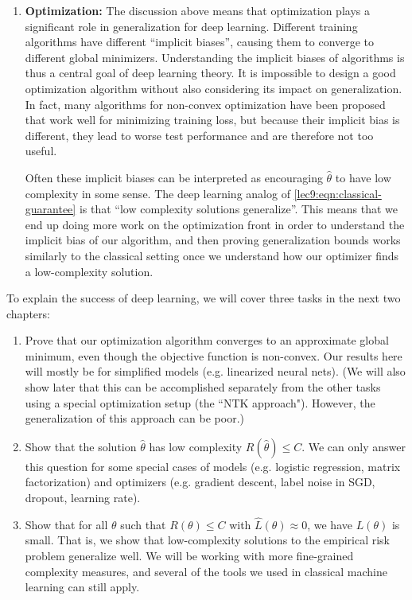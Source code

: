 \begin{enumerate}
\item {\bf Optimization:} The discussion above means that optimization plays a significant role in generalization for deep learning. Different training algorithms have different ``implicit biases'', causing them to converge to different global minimizers. Understanding the implicit biases of algorithms is thus a central goal of deep learning theory. It is impossible to design a good optimization algorithm without also considering its impact on generalization. In fact, many algorithms for non-convex optimization have been proposed that work well for minimizing training loss, but because their implicit bias is different, they lead to worse test performance and are therefore not too useful.
    
Often these implicit biases can be interpreted as encouraging $\hat\theta$ to have low complexity in some sense. The deep learning analog of  \eqref{lec9:eqn:classical-guarantee} is that ``low complexity solutions generalize''. This means that we end up doing more work on the optimization front in order to understand the implicit bias of our algorithm, and then proving generalization bounds works similarly to the classical setting once we understand how our optimizer finds a low-complexity solution.
    
\end{enumerate}

To explain the success of deep learning, we will cover three tasks in the next two chapters:

\begin{enumerate}
    \item Prove that our optimization algorithm converges to an approximate global minimum, even though the objective function is non-convex. Our results here will mostly be for simplified models (e.g. linearized neural nets). (We will also show later that this can be accomplished separately from the other tasks using a special optimization setup (the ``NTK approach"). However, the generalization of this approach can be poor.)
    
    \item Show that the solution $\hat{\theta}$ has low complexity $R(\hat{\theta})\leq C$. We can only answer this question for some special cases of models (e.g. logistic regression, matrix factorization) and optimizers (e.g. gradient descent, label noise in SGD, dropout, learning rate).
    
    \item Show that for all $\theta$ such that $R(\theta)\leq C$ with $\hat{L}(\theta)\approx 0$, we have $L(\theta)$ is small. That is, we show that low-complexity solutions to the empirical risk problem generalize well. We will be working with more fine-grained complexity measures, and several of the tools we used in classical machine learning can still apply.
\end{enumerate}
